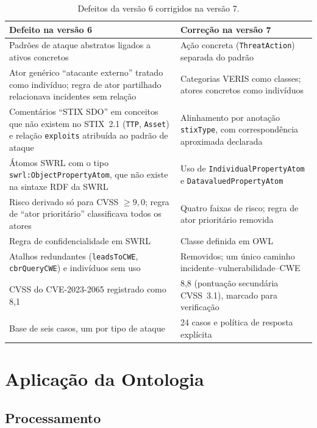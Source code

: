 \documentclass[12pt]{article}
\newcommand{\oc}[1]{\texttt{#1}}
\begin{document}
\begin{table}[ht]
\centering\small
\caption{Defeitos da versão 6 corrigidos na versão 7.}
\label{tab:evol}
\begin{tabularx}{\textwidth}{@{}XX@{}}
\toprule
Defeito na versão 6 & Correção na versão 7\\
\midrule
Padrões de ataque abstratos ligados a ativos concretos & Ação concreta (\oc{ThreatAction}) separada do padrão\\
Ator genérico ``atacante externo'' tratado como indivíduo; regra de ator partilhado relacionava incidentes sem relação & Categorias VERIS como classes; atores concretos como indivíduos\\
Comentários ``STIX SDO'' em conceitos que não existem no STIX~2.1 (\texttt{TTP}, \texttt{Asset}) e relação \texttt{exploits} atribuída ao padrão de ataque & Alinhamento por anotação \oc{stixType}, com correspondência aproximada declarada\\
Átomos SWRL com o tipo \texttt{swrl:ObjectPropertyAtom}, que não existe na sintaxe RDF da SWRL & Uso de \texttt{IndividualPropertyAtom} e \texttt{DatavaluedPropertyAtom} \cite{swrl}\\
Risco derivado só para CVSS $\geq 9{,}0$; regra de ``ator prioritário'' classificava todos os atores & Quatro faixas de risco; regra de ator prioritário removida\\
Regra de confidencialidade em SWRL & Classe definida em OWL\\
Atalhos redundantes (\texttt{leadsToCWE}, \texttt{cbrQueryCWE}) e indivíduos sem uso & Removidos; um único caminho incidente--vulnerabilidade--CWE\\
CVSS do CVE-2023-2065 registrado como 8,1 & 8,8 (pontuação secundária CVSS~3.1), marcado para verificação\\
Base de seis casos, um por tipo de ataque & 24 casos e política de resposta explícita\\
\bottomrule
\end{tabularx}
\end{table}

\section{Aplicação da Ontologia}
\label{sec:app}

\subsection{Processamento}
\end{document}
